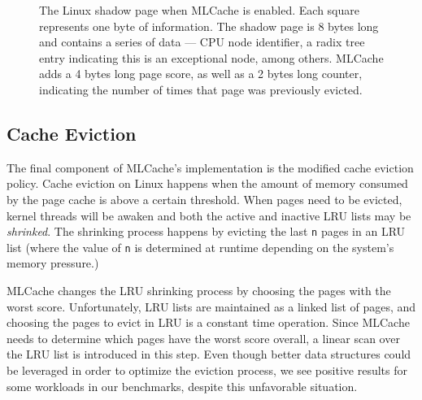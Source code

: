 \begin{figure}[h]
	\caption{The Linux shadow page when MLCache is enabled. Each square
		represents one byte of information.  The shadow page is 8 bytes long and
		contains a series of data --- CPU node identifier, a radix tree entry indicating
		this is an exceptional node, among others. MLCache adds a 4 bytes long page
		score, as well as a 2 bytes long counter, indicating the number of times that
		page was previously evicted.}
	\label{fig:shadow}
\end{figure}

\subsection{Cache Eviction}

The final component of MLCache's implementation is the modified cache eviction policy. Cache eviction
on Linux happens when the amount of memory consumed by the page cache is above a certain threshold.
When pages need to be evicted, kernel threads will be awaken and both the active and inactive
LRU lists may be \emph{shrinked}. The shrinking process happens by evicting the last \texttt{n}
pages in an LRU list (where the value of \texttt{n} is determined at runtime depending on the
system's memory pressure.)

MLCache changes the LRU shrinking process by choosing the pages with the worst score. Unfortunately,
LRU lists are maintained as a linked list of pages, and choosing the pages to evict in LRU is a
constant time operation. Since MLCache needs to determine which pages have the worst score overall,
a linear scan over the LRU list is introduced in this step. Even though better data structures could
be leveraged in order to optimize the eviction process, we see positive results for some workloads
in our benchmarks, despite this unfavorable situation.